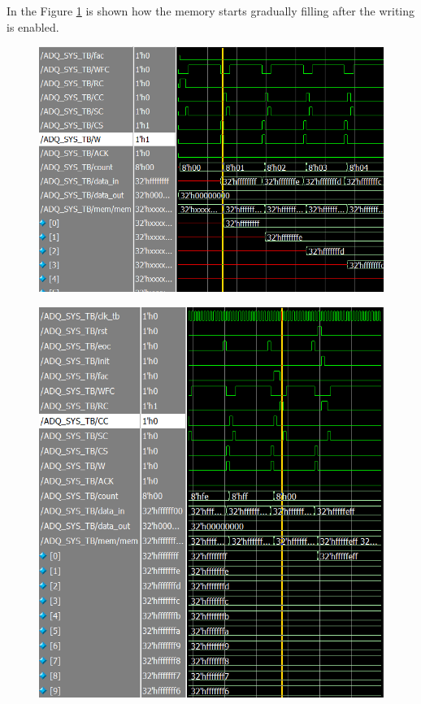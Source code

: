 \documentclass[conference]{IEEEtran}
\begin{document}
	In the Figure \ref{fig:fillingmem} is shown how the memory starts gradually filling after the writing is enabled.
	
	\begin{figure}[H]
		\centering
		\includegraphics[width=\columnwidth]{Files/Filling_mem}
		\caption{}
		\label{fig:fillingmem}
	\end{figure}
	
	\begin{figure}[H]
		\centering
		\includegraphics[width=\columnwidth]{"Files/Counter reset"}
		\caption{}
		\label{fig:counter-reset}
	\end{figure}
	
\end{document}
